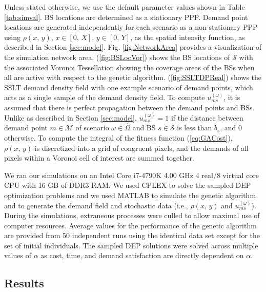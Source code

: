 \documentclass[conference]{IEEEtran}
\begin{document}
Unless stated otherwise, we use the default parameter values shown in Table \ref{tab:simval}.  BS locations are determined as a stationary PPP.  Demand point locations are generated independently for each scenario as a non-stationary PPP using $\rho\left(x,\, y\right),\, x \in [0,\, X],\, y \in [0,\, Y]$, as the spatial intensity function, as described in Section \ref{sec:model}.  Fig. \ref{fig:NetworkArea} provides a visualization of the simulation network area.  (\ref{fig:BSLocVor}) shows the BS locations of $\mathcal{S}$ with the associated Voronoi Tessellation showing the coverage areas of the BSs when all are active with respect to the genetic algorithm.  (\ref{fig:SSLTDPReal}) shows the SSLT demand density field with one example scenario of demand points, which acts as a single sample of the demand density field.  To compute $u_{ms}^{(\omega)}$, it is assumed that there is perfect propagation between the demand points and BSs.  Unlike as described in Section \ref{sec:model}, $u_{ms}^{(\omega)} = 1$ if the distance between demand point $m \in \mathcal{M}$ of scenario $\omega \in \hat{\Omega}$ and BS $s \in \mathcal{S}$ is less than $b_s$, and 0 otherwise.  To compute the integral of the fitness function (\ref{eq:GACost}), $\rho\left(x,\, y\right)$ is discretized into a grid of congruent pixels, and the demands of all pixels within a Voronoi cell of interest are summed together.

We ran our simulations on an Intel Core i7-4790K 4.00 GHz 4 real/8 virtual core CPU with 16 GB of DDR3 RAM.  We used CPLEX \cite{Cplex} to solve the sampled DEP optimization problems and we used MATLAB to simulate the genetic algorithm and to generate the demand field and stochastic data (i.e., $\rho\left(x,\, y\right)$ and $u_{ms}^{(\omega)}$).  During the simulations, extraneous processes were culled to allow maximal use of computer resources.  Average values for the performance of the genetic algorithm are provided from 50 independent runs using the identical data set except for the set of initial individuals.  The sampled DEP solutions were solved across multiple values of $\alpha$ as cost, time, and demand satisfaction are directly dependent on $\alpha$.

\subsection{Results} \label{subsec:results}
\end{document}
